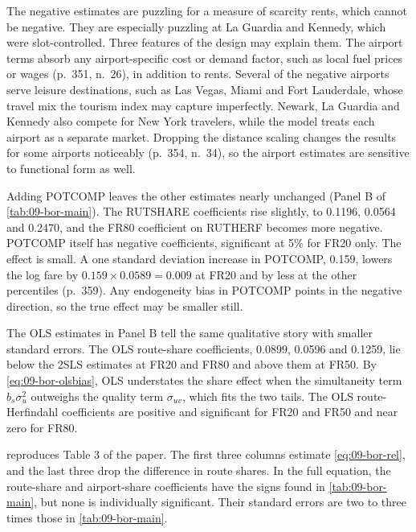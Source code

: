 The negative estimates are puzzling for a measure of scarcity rents, which cannot be negative. They are
especially puzzling at La Guardia and Kennedy, which were slot-controlled. Three features of the design may
explain them. The airport terms absorb any airport-specific cost or demand factor, such as local fuel prices or
wages (p.~351, n.~26), in addition to rents. Several of the negative airports serve leisure destinations, such
as Las Vegas, Miami and Fort Lauderdale, whose travel mix the tourism index may capture imperfectly. Newark, La
Guardia and Kennedy also compete for New York travelers, while the model treats each airport as a separate
market. Dropping the distance scaling changes the results for some airports noticeably (p.~354, n.~34), so the
airport estimates are sensitive to functional form as well.

 Adding POTCOMP leaves the other estimates nearly unchanged (Panel B of
\cref{tab:09-bor-main}). The RUTSHARE coefficients rise slightly, to 0.1196, 0.0564 and 0.2470, and the FR80
coefficient on RUTHERF becomes more negative. POTCOMP itself has negative coefficients, significant at 5\% for
FR20 only. The effect is small. A one standard deviation increase in POTCOMP, 0.159, lowers the log fare by
$0.159 \times 0.0589 = 0.009$ at FR20 and by less at the other percentiles (p.~359). Any endogeneity bias in
POTCOMP points in the negative direction, so the true effect may be smaller still.

 The OLS estimates in Panel B tell the same qualitative story with smaller standard
errors. The OLS route-share coefficients, 0.0899, 0.0596 and 0.1259, lie below the 2SLS estimates at FR20 and
FR80 and above them at FR50. By \cref{eq:09-bor-olsbias}, OLS understates the share effect when the simultaneity
term $b_s\sigma_u^2$ outweighs the quality term $\sigma_{uv}$, which fits the two tails. The OLS
route-Herfindahl coefficients are positive and significant for FR20 and FR50 and near zero for FR80.

  reproduces Table 3 of the paper. The first three
columns estimate \cref{eq:09-bor-rel}, and the last three drop the difference in route shares. In the full
equation, the route-share and airport-share coefficients have the signs found in \cref{tab:09-bor-main}, but
none is individually significant. Their standard errors are two to three times those in
\cref{tab:09-bor-main}.

